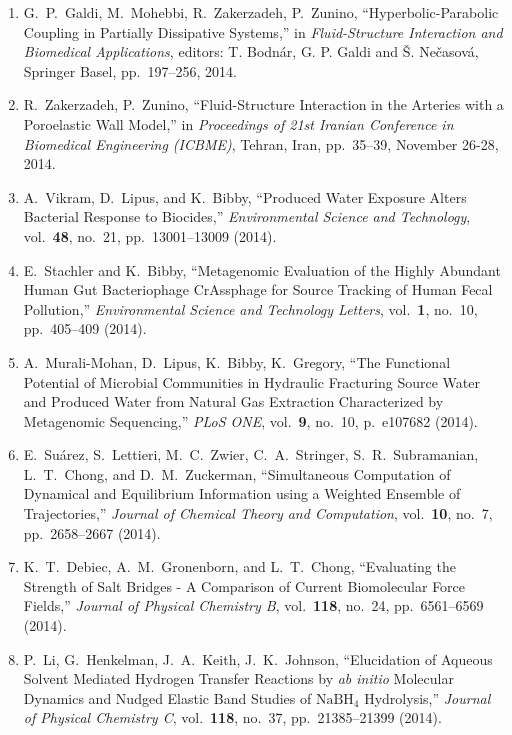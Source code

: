\begin{enumerate}
\item G.\ P.\ Galdi, M.\ Mohebbi, R.\ Zakerzadeh, P.\ Zunino,
  ``Hyperbolic-Parabolic Coupling in Partially Dissipative Systems,''
  in \textit{Fluid-Structure Interaction and Biomedical Applications},
  editors: T. Bodn\'{a}r, G. P. Galdi and \v{S}. Ne\v{c}asov\'{a},
  Springer Basel, pp.\ 197--256, 2014.

\item R.\ Zakerzadeh, P.\ Zunino, ``Fluid-Structure Interaction in the
  Arteries with a Poroelastic Wall Model,'' in \textit{Proceedings of
    21st Iranian Conference in Biomedical Engineering (ICBME)},
  Tehran, Iran, pp.\ 35--39, November 26-28, 2014.

\item A.\ Vikram, D.\ Lipus, and K.\ Bibby, ``Produced Water Exposure
  Alters Bacterial Response to Biocides,'' \textit{Environmental
    Science and Technology}, vol.\ \textbf{48}, no.\ 21,
  pp.\ 13001--13009 (2014).

\item E.\ Stachler and K.\ Bibby, ``Metagenomic Evaluation of the
  Highly Abundant Human Gut Bacteriophage CrAssphage for Source
  Tracking of Human Fecal Pollution,'' \textit{Environmental Science
    and Technology Letters}, vol.\ \textbf{1}, no.\ 10, pp.\ 405--409
  (2014).

\item A.\ Murali-Mohan, D.\ Lipus, K.\ Bibby, K.\ Gregory, ``The
  Functional Potential of Microbial Communities in Hydraulic
  Fracturing Source Water and Produced Water from Natural Gas
  Extraction Characterized by Metagenomic Sequencing,'' \textit{PLoS
    ONE}, vol.\ \textbf{9}, no.\ 10, p.\ e107682 (2014).

\item E.\ Su\'{a}rez, S.\ Lettieri, M.\ C.\ Zwier, C.\ A.\ Stringer,
  S.\ R.\ Subramanian, L.\ T.\ Chong, and D.\ M.\ Zuckerman,
  ``Simultaneous Computation of Dynamical and Equilibrium Information
  using a Weighted Ensemble of Trajectories,'' \textit{Journal of
    Chemical Theory and Computation}, vol.\ \textbf{10}, no.\ 7,
  pp.\ 2658--2667 (2014).

\item K.\ T.\ Debiec, A.\ M.\ Gronenborn, and L.\ T.\ Chong,
  ``Evaluating the Strength of Salt Bridges - A Comparison of Current
  Biomolecular Force Fields,'' \textit{Journal of Physical Chemistry
    B}, vol.\ \textbf{118}, no.\ 24, pp.\ 6561--6569 (2014).

\item P.\ Li, G.\ Henkelman, J.\ A.\ Keith, J.\ K.\ Johnson,
  ``Elucidation of Aqueous Solvent Mediated Hydrogen Transfer
  Reactions by \textit{ab initio} Molecular Dynamics and Nudged
  Elastic Band Studies of $\mathrm{Na}\mathrm{B}\mathrm{H}_4$
  Hydrolysis,'' \textit{Journal of Physical Chemistry C},
  vol.\ \textbf{118}, no.\ 37, pp.\ 21385--21399 (2014).


\end{enumerate}
